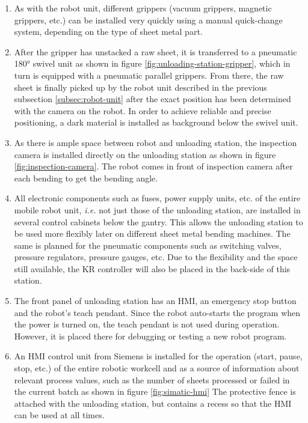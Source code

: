 \begin{enumerate}
    \item As with the robot unit, different grippers (vacuum grippers, magnetic grippers, etc.) can be
    installed very quickly using a manual quick-change system, depending on the type of sheet metal part.
    \item After the gripper has unstacked a raw sheet, it is transferred to a pneumatic 180° swivel unit as shown in figure \ref{fig:unloading-station-gripper}, which in
    turn is equipped with a pneumatic parallel grippers. From
    there, the raw sheet is finally picked up by the robot unit described in the previous subsection \ref{subsec:robot-unit} after the
    exact position has been determined with the camera on the robot. In order to achieve reliable and
    precise positioning, a dark material is installed as background below the swivel unit. 
    \item As there is ample space between robot and unloading station, the inspection camera is installed directly on the unloading station as shown in figure \ref{fig:inspection-camera}.
    The robot comes in front of inspection camera after each bending to get the bending angle.
    \item All electronic
    components such as fuses, power supply units, etc. of the entire mobile robot unit, \textit{i.e.} not just those of
    the unloading station, are installed in several control cabinets below the gantry. This allows the
    unloading station to be used more flexibly later on different sheet metal bending machines. The same is
    planned for the pneumatic components such as switching valves, pressure regulators, pressure
    gauges, etc. Due to the flexibility and the space still available, the KR controller will also be
    placed in the back-side of this station.
    \item The front panel of unloading station has an HMI, an emergency stop button and the robot's teach pendant. Since the robot auto-starts the program
    when the power is turned on, the teach pendant is not used during operation. However, it is placed there for debugging or testing a new robot program.


    \item An HMI control unit from Siemens is installed for the operation (start, pause, stop, etc.) of the entire robotic workcell and as
    a source of information about relevant process values, such as the number of sheets processed or failed in the current batch as shown in figure \ref{fig:simatic-hmi} The protective fence is attached with the unloading station, but contains a recess so that the HMI can be used at all times.
\end{enumerate}
